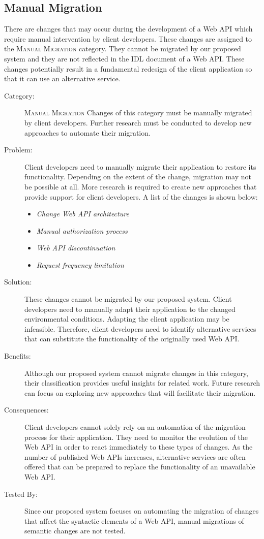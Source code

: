 \subsection{Manual Migration}\label{subsec:EvalManual}
There are changes that may occur during the development of a Web API which require manual intervention by client developers. These changes are assigned to the \textsc{Manual Migration} category. They cannot be migrated by our proposed system and they are not reflected in the IDL document of a Web API. These changes potentially result in a fundamental redesign of the client application so that it can use an alternative service.

\begin{description}
	\item[Category:] \textsc{Manual Migration} \newline Changes of this category must be manually migrated by client developers. Further research must be conducted to develop new approaches to automate their migration.
	\item[Problem:] Client developers need to manually migrate their application to restore its functionality. Depending on the extent of the change, migration may not be possible at all. More research is required to create new approaches that provide support for client developers. A list of the changes is shown below:
	\begin{itemize}
		\item \textit{Change Web API architecture} 
		\item \textit{Manual authorization process}
		\item \textit{Web API discontinuation}
		\item \textit{Request frequency limitation}
	\end{itemize}
	\item[Solution:] These changes cannot be migrated by our proposed system. Client developers need to manually adapt their application to the changed environmental conditions. Adapting the client application may be infeasible. Therefore, client developers need to identify alternative services that can substitute the functionality of the originally used Web API.
	\item[Benefits:] Although our proposed system cannot migrate changes in this category, their classification provides useful insights for related work. Future research can focus on exploring new approaches that will facilitate their migration.
	\item[Consequences:] Client developers cannot solely rely on an automation of the migration process for their application. They need to monitor the evolution of the Web API in order to react immediately to these types of changes. As the number of published Web APIs increases, alternative services are often offered that can be prepared to replace the functionality of an unavailable Web API.
	\item[Tested By:] Since our proposed system focuses on automating the migration of changes that affect the syntactic elements of a Web API, manual migrations of semantic changes are not tested.
\end{description}
